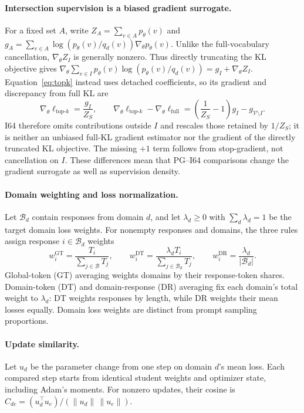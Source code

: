 \paragraph{Intersection supervision is a biased gradient surrogate.}
For a fixed set $A$, write $Z_A=\sum_{v\in A}p_\theta(v)$ and $g_A=\sum_{v\in A}\log(p_\theta(v)/q_d(v))\nabla_\theta p_\theta(v)$. Unlike the full-vocabulary cancellation, $\nabla_\theta Z_I$ is generally nonzero. Thus directly truncating the KL objective gives $\nabla_\theta\sum_{v\in I}p_\theta(v)\log(p_\theta(v)/q_d(v))=g_I+\nabla_\theta Z_I$. Equation~\ref{eq:topk} instead uses detached coefficients, so its gradient and discrepancy from full KL are
\begin{equation}
\nabla_\theta\ell_{\mathrm{top}\text{-}k}=\frac{g_I}{Z_S},\qquad
\nabla_\theta\ell_{\mathrm{top}\text{-}k}-\nabla_\theta\ell_{\mathrm{full}}
=\left(\frac{1}{Z_S}-1\right)g_I-g_{\mathcal V\setminus I}.
\label{eq:intersection_bias}
\end{equation}
I64 therefore omits contributions outside $I$ and rescales those retained by $1/Z_S$; it is neither an unbiased full-KL gradient estimator nor the gradient of the directly truncated KL objective. The missing $+1$ term follows from stop-gradient, not cancellation on $I$. These differences mean that PG--I64 comparisons change the gradient surrogate as well as supervision density.

\paragraph{Domain weighting and loss normalization.}
Let $\mathcal B_d$ contain responses from domain $d$, and let $\lambda_d\geq0$ with $\sum_d\lambda_d=1$ be the target domain loss weights. For nonempty responses and domains, the three rules assign response $i\in\mathcal B_d$ weights
\begin{equation}
w_i^{\mathrm{GT}}=\frac{T_i}{\sum_{j\in\mathcal B}T_j},\qquad
w_i^{\mathrm{DT}}=\frac{\lambda_d T_i}{\sum_{j\in\mathcal B_d}T_j},\qquad
w_i^{\mathrm{DR}}=\frac{\lambda_d}{|\mathcal B_d|}.
\label{eq:averaging}
\end{equation}
Global-token (GT) averaging weights domains by their response-token shares. Domain-token (DT) and domain-response (DR) averaging fix each domain's total weight to $\lambda_d$: DT weights responses by length, while DR weights their mean losses equally. Domain loss weights are distinct from prompt sampling proportions.

\paragraph{Update similarity.}
Let $u_d$ be the parameter change from one step on domain $d$'s mean loss. Each compared step starts from identical student weights and optimizer state, including Adam's moments. For nonzero updates, their cosine is $C_{de}=(u_d^\top u_e)/(\|u_d\|\,\|u_e\|)$.
